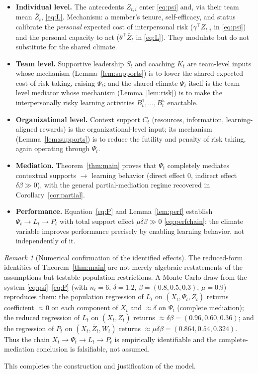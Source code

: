 \documentclass{amsart}
\theoremstyle{definition}
\theoremstyle{remark}
\newtheorem{remark}{Remark}
\begin{document}
\begin{itemize}
\item \textbf{Individual level.} The antecedents $Z_{t,i}$ enter
\eqref{eq:psi} and, via their team mean $\bar Z_t$, \eqref{eq:L}.
Mechanism: a member's tenure, self-efficacy, and status calibrate the
\emph{personal} expected cost of interpersonal risk
($\gamma^\top Z_{t,i}$ in \eqref{eq:psi}) and the personal capacity to act
($\theta^\top\bar Z_t$ in \eqref{eq:L}). They modulate but do not
substitute for the shared climate.

\item \textbf{Team level.} Supportive leadership $S_t$ and coaching $K_t$
are team-level inputs whose mechanism (Lemma~\ref{lem:supports}) is to
lower the shared expected cost of risk taking, raising $\Psi_t$; and the
shared climate $\Psi_t$ itself is the team-level mediator whose mechanism
(Lemma~\ref{lem:risk}) is to make the interpersonally risky learning
activities $B_t^1,\dots,B_t^5$ enactable.

\item \textbf{Organizational level.} Context support $C_t$
(resources, information, learning-aligned rewards) is the
organizational-level input; its mechanism (Lemma~\ref{lem:supports}) is to
reduce the futility and penalty of risk taking, again operating through
$\Psi_t$.

\item \textbf{Mediation.} Theorem~\ref{thm:main} proves that
$\Psi_t$ completely mediates contextual supports $\to$ learning behavior
(direct effect $0$, indirect effect $\delta\beta\gg0$), with the general
partial-mediation regime recovered in Corollary~\ref{cor:partial}.

\item \textbf{Performance.} Equation~\eqref{eq:P} and
Lemma~\ref{lem:perf} establish $\Psi_t\to L_t\to P_t$ with total support
effect $\mu\delta\beta\gg0$ \eqref{eq:perfchain}: the climate variable
improves performance precisely by enabling learning behavior, not
independently of it.
\end{itemize}

\begin{remark}[Numerical confirmation of the identified effects]
The reduced-form identities of Theorem~\ref{thm:main} are not merely
algebraic restatements of the assumptions but testable population
restrictions. A Monte-Carlo draw from the system
\eqref{eq:psi}--\eqref{eq:P} (with $n_t=6$, $\delta=1.2$,
$\beta=(0.8,0.5,0.3)$, $\mu=0.9$) reproduces them: the population
regression of $L_t$ on $(X_t,\Psi_t,\bar Z_t)$ returns coefficient
$\approx 0$ on each component of $X_t$ and $\approx\delta$ on $\Psi_t$
(complete mediation); the reduced regression of $L_t$ on $(X_t,\bar Z_t)$
returns $\approx\delta\beta=(0.96,0.60,0.36)$; and the regression of $P_t$
on $(X_t,\bar Z_t,W_t)$ returns $\approx\mu\delta\beta=(0.864,0.54,0.324)$.
Thus the chain $X_t\to\Psi_t\to L_t\to P_t$ is empirically identifiable and
the complete-mediation conclusion is falsifiable, not assumed.
\end{remark}

This completes the construction and justification of the model.
\end{document}
